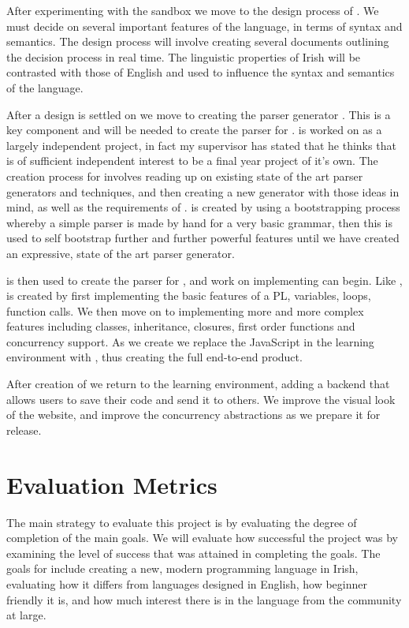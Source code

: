 After experimenting with the sandbox we move to the design process of \Setanta{}. We must decide on several important features of the language, in terms of syntax and semantics. The design process will involve creating several documents outlining the decision process in real time. The linguistic properties of Irish will be contrasted with those of English and used to influence the syntax and semantics of the language.

After a design is settled on we move to creating the parser generator \tsPEG{}. This is a key component and will be needed to create the parser for \Setanta{}. \tsPEG{} is worked on as a largely independent project, in fact my supervisor has stated that he thinks that \tsPEG{} is of sufficient independent interest to be a final year project of it's own. The creation process for \tsPEG{} involves reading up on existing state of the art parser generators and techniques, and then creating a new generator with those ideas in mind, as well as the requirements of \Setanta{}. \tsPEG{} is created by using a bootstrapping process whereby a simple parser is made by hand for a very basic grammar, then this is used to self bootstrap further and further powerful features until we have created an expressive, state of the art parser generator.

\tsPEG{} is then used to create the parser for \Setanta{}, and work on implementing \Setanta{} can begin. Like \tsPEG{}, \Setanta{} is created by first implementing the basic features of a PL, variables, loops, function calls. We then move on to implementing more and more complex features including classes, inheritance, closures, first order functions and concurrency support. As we create \Setanta{} we replace the JavaScript in the learning environment with \Setanta{}, thus creating the full end-to-end product.

After creation of \Setanta{} we return to the learning environment, adding a backend that allows users to save their code and send it to others. We improve the visual look of the website, and improve the concurrency abstractions as we prepare it for release.

\section{Evaluation Metrics}

The main strategy to evaluate this project is by evaluating the degree of completion of the main goals. We will evaluate how successful the project was by examining the level of success that was attained in completing the goals. The goals for \Setanta{} include creating a new, modern programming language in Irish, evaluating how it differs from languages designed in English, how beginner friendly it is, and how much interest there is in the language from the community at large.

